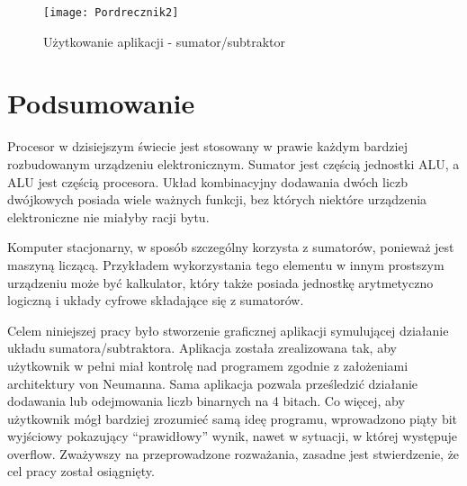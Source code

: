 \documentclass[12pt, a4paper, onside, polish]{article}				%
\begin{document}
   	\begin{figure}[H]
  	  {\centering \texttt{[image: Pordrecznik2]} \caption{Użytkowanie aplikacji - sumator/subtraktor}}\vspace{5mm}
  	 \end{figure}

\cleardoublepage




\section{Podsumowanie}
\hspace{\parindent}
Procesor w dzisiejszym świecie jest stosowany w prawie każdym bardziej rozbudowanym urządzeniu elektronicznym. Sumator jest częścią jednostki ALU, a ALU jest częścią procesora. Układ kombinacyjny dodawania dwóch liczb dwójkowych posiada wiele ważnych funkcji, bez których niektóre urządzenia elektroniczne nie miałyby racji bytu.

Komputer stacjonarny, w sposób szczególny korzysta z sumatorów, ponieważ jest maszyną liczącą. Przykładem wykorzystania tego elementu w innym prostszym urządzeniu może być kalkulator, który także posiada jednostkę arytmetyczno logiczną i układy cyfrowe składające się z sumatorów.

Celem niniejszej pracy było stworzenie graficznej aplikacji symulującej działanie układu sumatora/subtraktora. Aplikacja została zrealizowana tak, aby użytkownik w pełni miał kontrolę nad programem zgodnie z założeniami architektury von Neumanna. Sama aplikacja pozwala prześledzić działanie dodawania lub odejmowania liczb binarnych na 4 bitach. Co więcej, aby użytkownik mógł bardziej zrozumieć samą ideę programu, wprowadzono piąty bit wyjściowy pokazujący “prawidłowy” wynik, nawet w sytuacji, w której występuje overflow. Zważywszy na przeprowadzone rozważania, zasadne jest stwierdzenie, że cel pracy został osiągnięty.

\cleardoublepage
\end{document}
